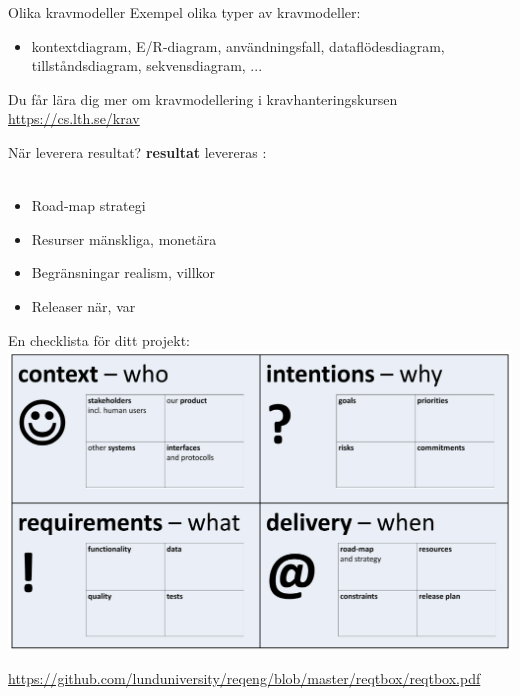 \documentclass{simpleslides}
\begin{document}
\begin{Slide}{Olika kravmodeller}
  Exempel olika typer av kravmodeller:
  \begin{itemize}
    \item kontextdiagram, E/R-diagram, användningsfall, dataflödesdiagram, tillståndsdiagram, sekvensdiagram, ... 
  \end{itemize}
  Du får lära dig mer om kravmodellering i kravhanteringskursen \href{https://cs.lth.se/krav}{https://cs.lth.se/krav}
\end{Slide}

\begin{Slide}{När leverera resultat?}
 \textbf{resultat} levereras : \\~
\begin{itemize}
\item Road-map \hfill strategi
\item Resurser  \hfill mänskliga, monetära
\item Begränsningar \hfill realism, villkor
\item Releaser \hfill när, var
\end{itemize}
\end{Slide}


\begin{Slide}{En checklista för ditt projekt:}
\hspace*{-0.55cm}\includegraphics[width=1.1\textwidth]{img/reqt-box}

{\noindent\tiny\href{https://github.com/lunduniversity/reqeng/blob/master/reqtbox/reqtbox.pdf}{https://github.com/lunduniversity/reqeng/blob/master/reqtbox/reqtbox.pdf}}
\end{Slide}
\end{document}
